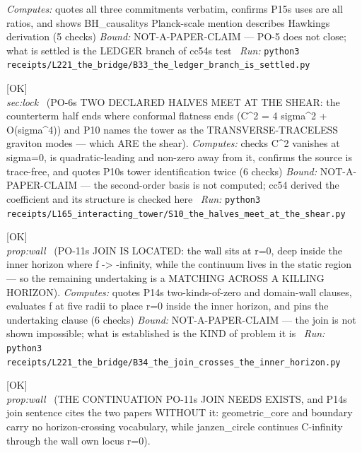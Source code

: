 \begin{description}
\emph{Computes:} quotes all three commitments verbatim, confirms P15s uses are all ratios, and shows BH\_causalitys Planck-scale mention describes Hawkings derivation (5 checks)
 \emph{Bound:} NOT-A-PAPER-CLAIM --- PO-5 does not close; what is settled is the LEDGER branch of cc54s test
\ \emph{Run:} \texttt{python3 receipts/L221\_the\_bridge/B33\_the\_ledger\_branch\_is\_settled.py}
\item[\label{rcpt:S10_the_halves_meet_at_the_shear}\texttt{S10\_the\_halves\_meet\_at\_the\_shear}]\hfill\textsf{[OK]}\\
\textit{sec:lock} \ (PO-6s TWO DECLARED HALVES MEET AT THE SHEAR: the counterterm half ends where conformal flatness ends (C\textasciicircum{}2 = 4 sigma\textasciicircum{}2 + O(sigma\textasciicircum{}4)) and P10 names the tower as the TRANSVERSE-TRACELESS graviton modes --- which ARE the shear). 
\emph{Computes:} checks C\textasciicircum{}2 vanishes at sigma=0, is quadratic-leading and non-zero away from it, confirms the source is trace-free, and quotes P10s tower identification twice (6 checks)
 \emph{Bound:} NOT-A-PAPER-CLAIM --- the second-order basis is not computed; cc54 derived the coefficient and its structure is checked here
\ \emph{Run:} \texttt{python3 receipts/L165\_interacting\_tower/S10\_the\_halves\_meet\_at\_the\_shear.py}
\item[\label{rcpt:B34_the_join_crosses_the_inner_horizon}\texttt{B34\_the\_join\_crosses\_the\_inner\_horizon}]\hfill\textsf{[OK]}\\
\textit{prop:wall} \ (PO-11s JOIN IS LOCATED: the wall sits at r=0, deep inside the inner horizon where f -> -infinity, while the continuum lives in the static region --- so the remaining undertaking is a MATCHING ACROSS A KILLING HORIZON). 
\emph{Computes:} quotes P14s two-kinds-of-zero and domain-wall clauses, evaluates f at five radii to place r=0 inside the inner horizon, and pins the undertaking clause (6 checks)
 \emph{Bound:} NOT-A-PAPER-CLAIM --- the join is not shown impossible; what is established is the KIND of problem it is
\ \emph{Run:} \texttt{python3 receipts/L221\_the\_bridge/B34\_the\_join\_crosses\_the\_inner\_horizon.py}
\item[\label{rcpt:B35_the_continuation_is_cited_wrong}\texttt{B35\_the\_continuation\_is\_cited\_wrong}]\hfill\textsf{[OK]}\\
\textit{prop:wall} \ (THE CONTINUATION PO-11s JOIN NEEDS EXISTS, and P14s join sentence cites the two papers WITHOUT it: geometric\_core and boundary carry no horizon-crossing vocabulary, while janzen\_circle continues C-infinity through the wall own locus r=0). 

\end{description}
